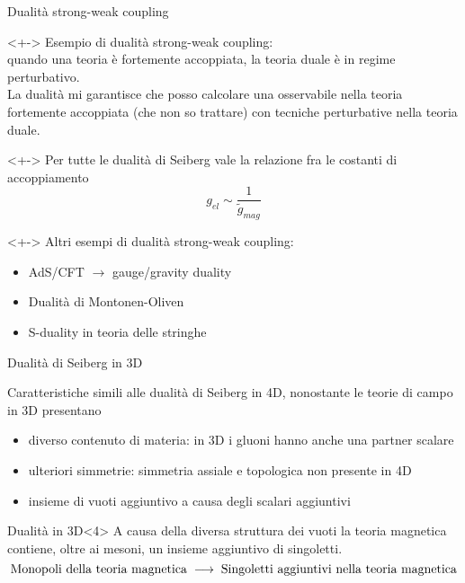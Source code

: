 \documentclass[9pt,compress]{beamer}
\begin{document}
\begin{frame}{Dualità strong-weak coupling}
\begin{block}{}<+->
Esempio di dualità strong-weak coupling:\\
quando una teoria è fortemente accoppiata, la teoria duale è in regime perturbativo.\\
La dualità mi garantisce che posso calcolare una osservabile nella teoria fortemente accoppiata (che non so trattare) con tecniche perturbative nella teoria duale.\\
\end{block}

\begin{block}{}<+->
Per tutte le dualità di Seiberg vale la relazione fra le costanti di accoppiamento
 $$
  g_{el} \sim \frac{1}{\tilde{g}_{mag}} 
$$
\end{block}


\begin{block}{}<+->
Altri esempi di dualità strong-weak coupling:
\begin{itemize}
\item AdS/CFT $\rightarrow$ gauge/gravity duality 
\item Dualità di Montonen-Oliven
\item S-duality in teoria delle stringhe
\end{itemize}
\end{block}

\end{frame}

\begin{frame}{Dualità di Seiberg in 3D}
\begin{block}{}
Caratteristiche simili alle dualità di Seiberg in 4D, nonostante le teorie di campo in 3D presentano
\begin{itemize}
\item<1-> diverso contenuto di materia: in 3D i gluoni hanno anche una partner scalare
\item <2-> ulteriori simmetrie: simmetria assiale e topologica non presente in 4D
\item <3-> insieme di vuoti aggiuntivo a causa degli scalari aggiuntivi 
\end{itemize}
\end{block}

\begin{block}{Dualità in 3D}<4>
A causa della diversa struttura dei vuoti la teoria magnetica contiene, oltre ai mesoni, un insieme aggiuntivo di singoletti.
$$
\hbox{Monopoli della teoria magnetica} \; \longrightarrow \; \hbox{Singoletti aggiuntivi nella teoria magnetica}
$$
\end{block}
\end{frame}
\end{document}
